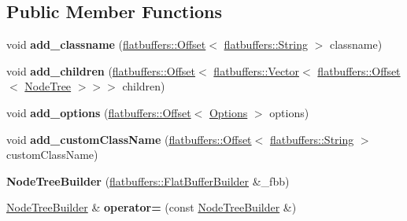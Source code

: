 \subsection*{Public Member Functions}
\begin{DoxyCompactItemize}
\item 
\mbox{\label{structflatbuffers_1_1NodeTreeBuilder_aee2ad62a8758081ebee7d8594ba13975}} 
void {\bfseries add\+\_\+classname} (\hyperlink{structflatbuffers_1_1Offset}{flatbuffers\+::\+Offset}$<$ \hyperlink{structflatbuffers_1_1String}{flatbuffers\+::\+String} $>$ classname)
\item 
\mbox{\label{structflatbuffers_1_1NodeTreeBuilder_ae833713a2c701f9df28c6ce431caec3b}} 
void {\bfseries add\+\_\+children} (\hyperlink{structflatbuffers_1_1Offset}{flatbuffers\+::\+Offset}$<$ \hyperlink{classflatbuffers_1_1Vector}{flatbuffers\+::\+Vector}$<$ \hyperlink{structflatbuffers_1_1Offset}{flatbuffers\+::\+Offset}$<$ \hyperlink{structflatbuffers_1_1NodeTree}{Node\+Tree} $>$$>$$>$ children)
\item 
\mbox{\label{structflatbuffers_1_1NodeTreeBuilder_a4aa012f12973655566365e946da362fc}} 
void {\bfseries add\+\_\+options} (\hyperlink{structflatbuffers_1_1Offset}{flatbuffers\+::\+Offset}$<$ \hyperlink{structflatbuffers_1_1Options}{Options} $>$ options)
\item 
\mbox{\label{structflatbuffers_1_1NodeTreeBuilder_a7e54e2e8b958528b9c18ce46c2a29786}} 
void {\bfseries add\+\_\+custom\+Class\+Name} (\hyperlink{structflatbuffers_1_1Offset}{flatbuffers\+::\+Offset}$<$ \hyperlink{structflatbuffers_1_1String}{flatbuffers\+::\+String} $>$ custom\+Class\+Name)
\item 
\mbox{\label{structflatbuffers_1_1NodeTreeBuilder_a01676b4a1e79f03bbbb794cef1b98f65}} 
{\bfseries Node\+Tree\+Builder} (\hyperlink{classflatbuffers_1_1FlatBufferBuilder}{flatbuffers\+::\+Flat\+Buffer\+Builder} \&\+\_\+fbb)
\item 
\mbox{\label{structflatbuffers_1_1NodeTreeBuilder_aaf5f21a6a6a237d4dd6dadffa7a60b8c}} 
\hyperlink{structflatbuffers_1_1NodeTreeBuilder}{Node\+Tree\+Builder} \& {\bfseries operator=} (const \hyperlink{structflatbuffers_1_1NodeTreeBuilder}{Node\+Tree\+Builder} \&)

\end{DoxyCompactItemize}
